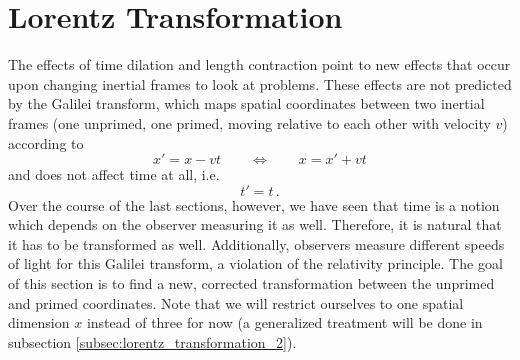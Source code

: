 




\newpage



	\section{Lorentz Transformation}
The effects of time dilation and length contraction point to new effects that occur upon changing inertial frames to look at problems. These effects are not predicted by the Galilei transform, which maps spatial coordinates between two inertial frames (one unprimed, one primed, moving relative to each other with velocity $v$) according to 
\begin{equation*}
x' = x - v t
\qquad \Leftrightarrow \qquad
x = x' + v t
\end{equation*}
and does not affect time at all, i.e.
\begin{equation*}
t' = t \, .
\end{equation*}
Over the course of the last sections, however, we have seen that time is a notion which depends on the observer measuring it as well. Therefore, it is natural that it has to be transformed as well. Additionally, observers measure different speeds of light for this Galilei transform, a violation of the relativity principle. The goal of this section is to find a new, corrected transformation between the unprimed and primed coordinates. Note that we will restrict ourselves to one spatial dimension $x$ instead of three for now (a generalized treatment will be done in subsection \ref{subsec:lorentz_transformation_2}).\\


